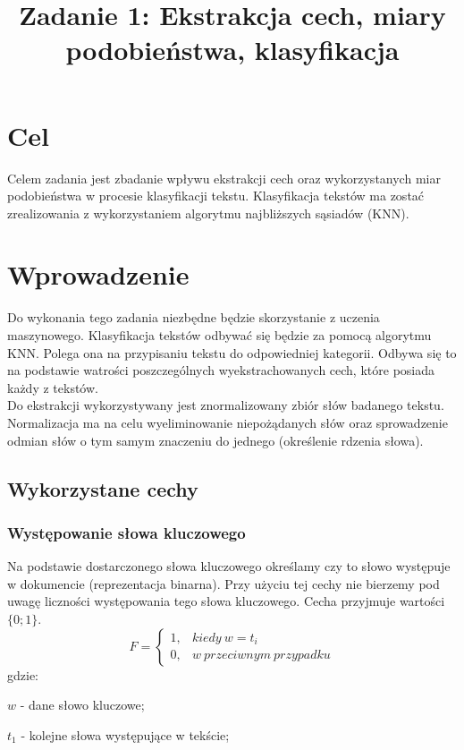\documentclass{classrep}
\author{
  \studentinfo{Konrad Jachimstal}{211807} \and
  \studentinfo{ Patryk Janicki}{211951}
}
\title{Zadanie 1: Ekstrakcja cech, miary podobieństwa, klasyfikacja}
\begin{document}
\pgfplotsset{scaled y ticks=false}
\maketitle

\section{Cel}
{Celem zadania jest zbadanie wpływu ekstrakcji cech oraz wykorzystanych miar podobieństwa w procesie klasyfikacji tekstu. 
Klasyfikacja tekstów ma zostać zrealizowania z wykorzystaniem algorytmu najbliższych sąsiadów (KNN).}

\section{Wprowadzenie}
Do wykonania tego zadania niezbędne będzie skorzystanie z uczenia maszynowego.
Klasyfikacja tekstów odbywać się będzie za pomocą algorytmu KNN. Polega ona na przypisaniu tekstu do odpowiedniej
kategorii. Odbywa się to na podstawie watrości poszczególnych wyekstrachowanych cech, które posiada każdy z tekstów.\\
Do ekstrakcji wykorzystywany jest znormalizowany zbiór słów badanego tekstu. Normalizacja ma na
celu wyeliminowanie niepożądanych słów oraz sprowadzenie odmian słów o tym samym znaczeniu do jednego (określenie rdzenia słowa).
\clearpage
\subsection[]{Wykorzystane cechy} \label{wykorzystane_cechy}
\subsubsection{Występowanie słowa kluczowego}
Na podstawie dostarczonego słowa kluczowego określamy czy to słowo występuje w dokumencie (reprezentacja binarna).
Przy użyciu tej cechy nie bierzemy pod uwagę liczności występowania tego słowa kluczowego. Cecha przyjmuje wartości $\{0; 1\}$.
\begin{equation}
    F=\left\{\begin{matrix}
                 1, & kiedy\ w = t_{i}\\
                 0, & w\ przeciwnym\ przypadku
    \end{matrix}\right.
\end{equation}
gdzie:\\
\begin{description}
    \item $w$ - dane słowo kluczowe;
    \item $t_{1}$ - kolejne słowa występujące w tekście;
\end{description}
\end{document}

